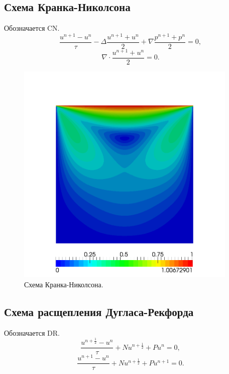 \documentclass[12pt]{article}
\begin{document}
\subsection{Схема Кранка-Николсона}
Обозначается CN.
\begin{equation}
\frac{u^{n+1}-u^n}{\tau} - \Delta \frac{u^{n+1}+u^n}{2}+\nabla \frac{p^{n+1}+p^n}{2}=0,
\end{equation}
\begin{equation}
\nabla \cdot \frac{u^{n+1}+u^{n}}{2}=0.
\end{equation}

\begin{figure}
	\begin{center}
		\includegraphics[width=400px]{pics/cn}
		\caption{Схема Кранка-Николсона.}
		\label{fg:velocity-cn}
	\end{center}
\end{figure}

\subsection{Схема расщепления Дугласа-Рекфорда}
Обозначается DR.
\begin{equation}
\frac{u^{n+\frac{1}{2}}-u^n}{\tau} + Nu^{n+\frac{1}{2}}+Pu^n=0,
\end{equation}
\begin{equation}
\frac{u^{n+1}-u^n}{\tau} + Nu^{n+\frac{1}{2}}+Pu^{n+1}=0.
\end{equation}
\end{document}
